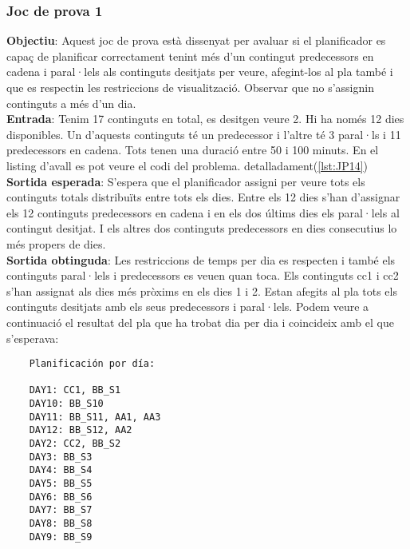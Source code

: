 \documentclass[a4paper]{article}
\begin{document}
	\subsubsection{Joc de prova 1}
	\textbf{Objectiu}: Aquest joc de prova està dissenyat per avaluar si el planificador es capaç de planificar correctament tenint més d'un contingut predecessors en cadena i paral·lels als continguts desitjats per veure, afegint-los al pla també i que es respectin les restriccions de visualització. Observar que no s'assignin continguts a més d'un dia.  \\
	\textbf{Entrada}: Tenim 17 continguts en total, es desitgen veure 2. Hi ha només 12 dies disponibles. Un d'aquests continguts té un predecessor i l'altre té 3 paral·ls i 11 predecessors en cadena. Tots tenen una duració entre 50 i 100 minuts. En el listing d'avall es pot veure el codi del problema.  detalladament(\ref{lst:JP14})\\
	\textbf{Sortida esperada}: S'espera que el planificador assigni per veure tots els continguts totals distribuïts entre tots els dies. Entre els 12 dies s'han d'assignar els 12 continguts predecessors en cadena i en els dos últims dies els paral·lels al contingut desitjat. I els altres dos continguts predecessors en dies consecutius lo més propers de dies. \\
	\textbf{Sortida obtinguda}:  Les restriccions de temps per dia es respecten i també els continguts paral·lels i predecessors es veuen quan toca. Els continguts cc1 i cc2 s'han assignat als dies més pròxims en els dies 1 i 2. Estan afegits al pla tots els continguts desitjats amb els seus predecessors i paral·lels. Podem veure a continuació el resultat del pla que ha trobat dia per dia i coincideix amb el que s'esperava:
	
	\begin{verbatim}
	Planificación por día:
	
	DAY1: CC1, BB_S1
	DAY10: BB_S10
	DAY11: BB_S11, AA1, AA3
	DAY12: BB_S12, AA2
	DAY2: CC2, BB_S2
	DAY3: BB_S3
	DAY4: BB_S4
	DAY5: BB_S5
	DAY6: BB_S6
	DAY7: BB_S7
	DAY8: BB_S8
	DAY9: BB_S9
	\end{verbatim}
	
\end{document}
